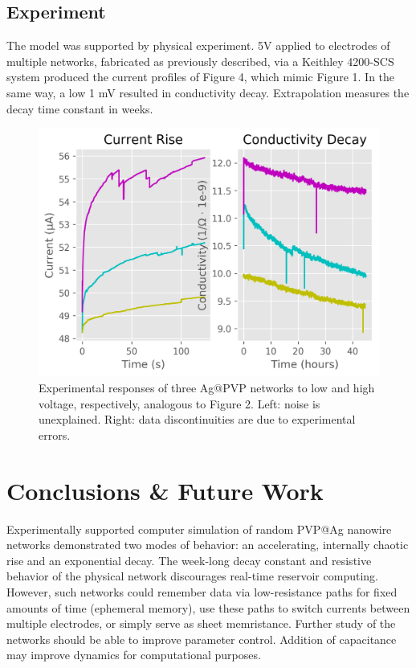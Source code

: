 \documentclass[twocolumn]{article}
\begin{document}
\subsection{Experiment}

The model was supported by physical experiment. 5V applied to electrodes of multiple networks, fabricated as previously described, via a Keithley 4200-SCS system produced the current profiles of Figure 4, which mimic Figure 1. In the same way, a low 1 mV resulted in conductivity decay. Extrapolation measures the decay time constant in weeks.

\begin{figure}[h]
\includegraphics[width=\columnwidth]{resources/experiment.png}
\caption{Experimental responses of three Ag@PVP networks to low and high voltage, respectively, analogous to Figure 2. Left: noise is unexplained. Right: data discontinuities are due to experimental errors.}
\end{figure}

\vspace{-.15in}

\section{Conclusions \& Future Work}

Experimentally supported computer simulation of random PVP@Ag nanowire networks demonstrated two modes of behavior: an accelerating, internally chaotic rise and an exponential decay. The week-long decay constant and resistive behavior of the physical network discourages real-time reservoir computing. However, such networks could remember data via low-resistance paths for fixed amounts of time (ephemeral memory), use these paths to switch currents between multiple electrodes, or simply serve as sheet memristance. Further study of the networks should be able to improve parameter control. Addition of capacitance may improve dynamics for computational purposes.
\end{document}
